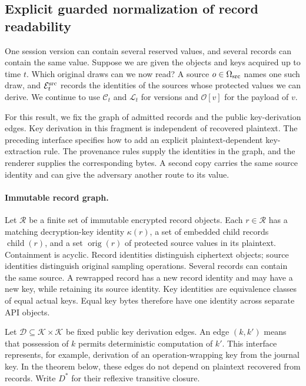 \subsection{Explicit guarded normalization of record readability}
\label{sec:guarded-provenance}

One session version can contain several reserved values, and several
records can contain the same value. Suppose we are given the objects
and keys acquired up to time $t$. Which original draws can we now read?
A source $o\in\Omega_{\rm src}$ names one such draw, and
$\mathcal E^{\rm src}_t$ records the identities of the sources whose
protected values we can derive. We continue to use $\mathcal C_t$ and
$\mathcal L_t$ for versions and $\mathcal O[v]$ for the payload of $v$.

For this result, we fix the graph of admitted records and the public key-derivation
edges. Key derivation in this fragment is independent of recovered
plaintext. The preceding interface specifies how to add an explicit
plaintext-dependent key-extraction rule. The provenance rules supply
the identities in the graph, and the renderer supplies the corresponding
bytes. A second copy carries the same source identity and can give the
adversary another route to its value.

\paragraph{Immutable record graph.}
Let $\mathcal R$ be a finite set of immutable encrypted record objects.
Each $r\in\mathcal R$ has a matching decryption-key identity $\kappa(r)$,
a set of embedded child records $\operatorname{child}(r)$, and a set
$\operatorname{orig}(r)$ of protected source values in its plaintext.
Containment is acyclic.  Record identities distinguish ciphertext objects;
source identities distinguish original sampling operations.  Several
records can contain the same source.  A rewrapped record has a new record
identity and may have a new key, while retaining its source identity.
Key identities are equivalence classes of equal actual keys. Equal key bytes
therefore have one identity across separate API objects.

Let $\mathcal D\subseteq\mathcal K\times\mathcal K$ be fixed public key
derivation edges.  An edge $(k,k')$ means that possession of $k$ permits
deterministic computation of $k'$.  This interface represents, for example,
derivation of an operation-wrapping key from the journal key.  In the
theorem below, these edges do not depend on plaintext recovered from records.
Write $D^*$ for their reflexive transitive closure.


